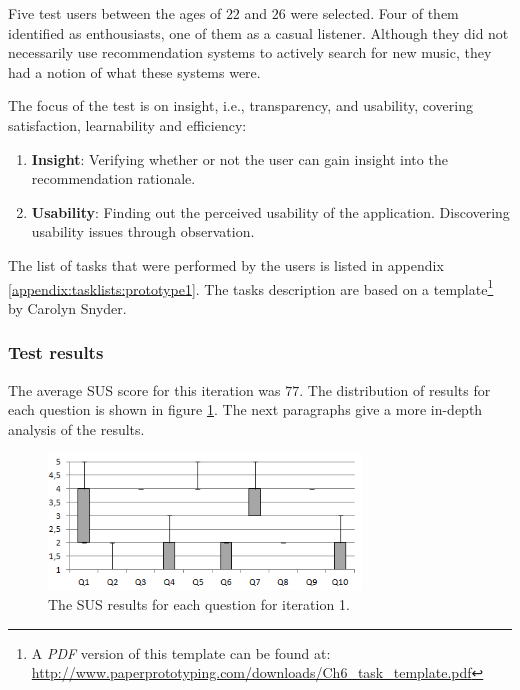 Five test users between the ages of $22$ and $26$ were selected. Four of them identified as enthousiasts, one of them as a casual listener. Although they did not necessarily use recommendation systems to actively search for new music, they had a notion of what these systems were.

The focus of the test is on insight, i.e., transparency, and usability, covering satisfaction, learnability and efficiency:

\begin{enumerate}
	\item \textbf{Insight}: Verifying whether or not the user can gain insight into the recommendation rationale.
	\item \textbf{Usability}: Finding out the perceived usability of the application. Discovering usability issues through observation.
\end{enumerate}


The list of tasks that were performed by the users is listed in appendix \ref{appendix:tasklists:prototype1}. The tasks description are based on a template\footnote{A \emph{PDF} version of this template can be found at: \url{http://www.paperprototyping.com/downloads/Ch6_task_template.pdf}} by Carolyn Snyder\cite{snyder:2003}.


\subsubsection{Test results}\label{chapter:prototype:section:paper:results}


The average SUS score for this iteration was $77$. The distribution of results for each question is shown in figure \ref{fig:iterations_sus_scores_it1_boxplots}. The next paragraphs give a more in-depth analysis of the results.

\begin{figure}
	\begin{center}
		\includegraphics[width=8.3cm]{img/iterations_sus_scores_it1_boxplots}
	\end{center}
	\caption{The SUS results for each question for iteration 1.}
	\label{fig:iterations_sus_scores_it1_boxplots}
\end{figure}


